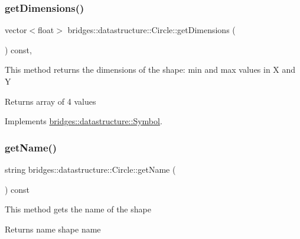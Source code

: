 \subsubsection{\texorpdfstring{get\+Dimensions()}{getDimensions()}}
{\footnotesize\ttfamily vector$<$float$>$ bridges\+::datastructure\+::\+Circle\+::get\+Dimensions (\begin{DoxyParamCaption}{ }\end{DoxyParamCaption}) const\hspace{0.3cm}{\ttfamily [inline]}, {\ttfamily [virtual]}}

This method returns the dimensions of the shape\+: min and max values in X and Y

\begin{DoxyReturn}{Returns}
array of 4 values 
\end{DoxyReturn}


Implements \hyperlink{classbridges_1_1datastructure_1_1_symbol_a5c1cb50770c4f4a2ff9c8642afc0d665}{bridges\+::datastructure\+::\+Symbol}.

\mbox{\label{classbridges_1_1datastructure_1_1_circle_a3c7808f7918cb01ceaa3f6bf46e6bee5}} 
\subsubsection{\texorpdfstring{get\+Name()}{getName()}}
{\footnotesize\ttfamily string bridges\+::datastructure\+::\+Circle\+::get\+Name (\begin{DoxyParamCaption}{ }\end{DoxyParamCaption}) const\hspace{0.3cm}{\ttfamily [inline]}}

This method gets the name of the shape

\begin{DoxyReturn}{Returns}
name shape name 
\end{DoxyReturn}
\mbox{\label{classbridges_1_1datastructure_1_1_circle_a796c88ccb8c5529d45aa7271a34fa3fe}} 
